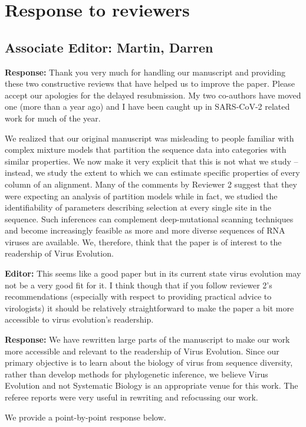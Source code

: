 \documentclass[aps,rmp,onecolumn]{revtex4-1}
\newcommand{\editor}[1]{\textbf{Editor:} #1}
\newcommand{\response}[1]{{\it {\color{response}\textbf{Response:} #1}}}
\begin{document}
\section*{Response to reviewers}

\subsection*{Associate Editor: Martin, Darren}

\response{
Thank you very much for handling our manuscript and providing these two constructive reviews that have helped us to improve the paper. Please accept our apologies for the delayed resubmission. My two co-authors have moved one (more than a year ago) and I have been caught up in SARS-CoV-2 related work for much of the year.

We realized that our original manuscript was misleading to people familiar with complex mixture models that partition the sequence data into categories with similar properties. We now make it very explicit that this is not what we study -- instead, we study the extent to which we can estimate specific properties of every column of an alignment. Many of the comments by Reviewer 2 suggest that they were expecting an analysis of partition models while in fact, we studied the identifiability of parameters describing selection at every single site in the sequence. Such inferences can complement deep-mutational scanning techniques and become increasingly feasible as more and more diverse sequences of RNA viruses are available. We, therefore, think that the paper is of interest to the readership of Virus Evolution.
}

\editor{This seems like a good paper but in its current state virus evolution may not be a very good fit for it.  I think though that if you follow reviewer 2's recommendations (especially with respect to providing practical advice to virologists) it should be relatively straightforward to make the paper a bit more accessible to virus evolution's readership.}

\response{
We have rewritten large parts of the manuscript to make our work more accessible and relevant to the readership of Virus Evolution.
Since our primary objective is to learn about the biology of virus from sequence diversity, rather than develop methods for phylogenetic inference, we believe Virus Evolution and not Systematic Biology is an appropriate venue for this work.
The referee reports were very useful in rewriting and refocussing our work.

We provide a point-by-point response below.
}
\end{document}
